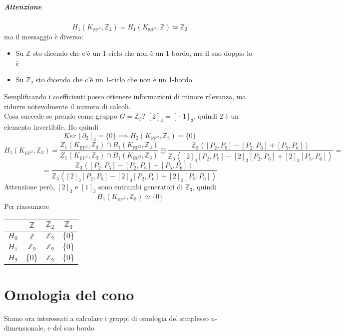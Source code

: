 \documentclass[a4paper]{report}
\newcommand{\Z}{\ensuremath{\mathbb{Z}}}
\newcommand{\KRP}[1]{\ensuremath{K_{\mathbb{RP}^{#1}}}}
\newcommand{\gen}[1]{\ensuremath{\left<{#1}\right>}}
\begin{document}
\paragraph{Attenzione}
\[
    H_1(\KRP{2},\Z_2)=H_1(\KRP{2},\Z)\simeq\Z_2
\]
ma il messaggio è diverso:
\begin{itemize}
    \item Su $\Z$ sto dicendo che c'è un 1-ciclo che non è un 1-bordo, ma il suo doppio lo è
    \item Su $\Z_2$ sto dicendo che c'è un 1-ciclo che non è un 1-bordo
\end{itemize}
Semplificando i coefficienti posso ottenere informazioni di minore rilevanza, ma ridurre notevolmente il numero di calcoli.\\
Cosa succede se prendo come gruppo $G=\Z_3$? $[2]_3=[-1]_3$, quindi $2$ è un elemento invertibile. Ho quindi
\[
    Ker\ [\partial_2]_3=\{0\}\implies H_2(\KRP{2},\Z_3)=\{0\}    
\]
\[
    H_1(\KRP{2},\Z_3)=\frac{Z_1(\KRP{2},\Z_3)\cap B_1(\KRP{2},\Z_3)}{Z_1(\KRP{2},\Z_3)\cap B_1(\KRP{2},\Z_3)}\oplus\frac{\Z_3\gen{[P_2,P_5]-[P_2,P_6]+[P_5,P_6]}}{\Z_3\gen{[2]_3[P_2,P_5]-[2]_3[P_2,P_6]+[2]_3[P_5,P_6]}}=  
\]
\[
    =\frac{\Z_3\gen{[P_2,P_5]-[P_2,P_6]+[P_5,P_6]}}{\Z_3\gen{[2]_3[P_2,P_5]-[2]_3[P_2,P_6]+[2]_3[P_5,P_6]}}
\]
Attenzione però, $[2]_3$ e $[1]_3$ sono entrambi generatori di $\Z_3$, quindi
\[
    H_1(\KRP{2},\Z_3)\simeq\{0\}
\] 
Per riassumere
\begin{center}
    \begin{tabular}{|c|c|c|c|}
        \hline
                & $\Z$      & $\Z_2$    & $\Z_3$  \\ \hline
        $H_0$   & $\Z$      & $\Z_2$    & $\{0\}$ \\ \hline
        $H_1$   & $\Z_2$    & $\Z_2$    & $\{0\}$ \\ \hline
        $H_2$   & $\{0\}$   & $\Z_2$    & $\{0\}$ \\ \hline
    \end{tabular}
\end{center}
\chapter{Omologia del cono}
Siamo ora interessati a calcolare i gruppi di omologia del simplesso n-dimensionale, e del suo bordo
\end{document}
